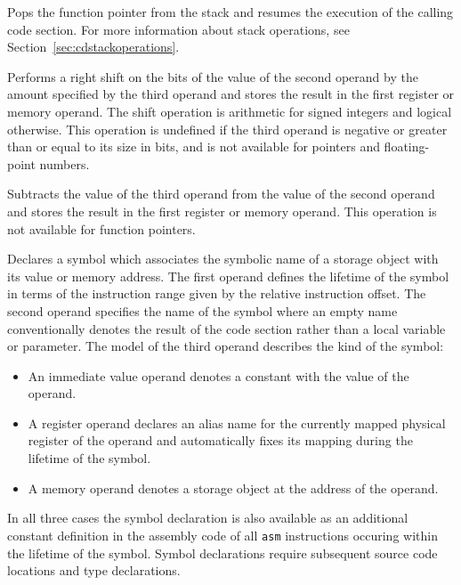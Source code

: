Pops the function pointer from the stack and resumes the execution of the calling code section.
For more information about stack operations, see Section~\ref{sec:cdstackoperations}.


Performs a right shift on the bits of the value of the second operand by the amount specified by the third operand and stores the result in the first register or memory operand.
The shift operation is arithmetic for signed integers and logical otherwise.
This operation is undefined if the third operand is negative or greater than or equal to its size in bits, and is not available for pointers and floating-point numbers.


Subtracts the value of the third operand from the value of the second operand and stores the result in the first register or memory operand.
This operation is not available for function pointers.


Declares a symbol which associates the symbolic name of a storage object with its value or memory address.
The first operand defines the lifetime of the symbol in terms of the instruction range given by the relative instruction offset.
The second operand specifies the name of the symbol where an empty name conventionally denotes the result of the code section rather than a local variable or parameter.
The model of the third operand describes the kind of the symbol:

\begin{itemize}
\item An immediate value operand denotes a constant with the value of the operand.
\item A register operand declares an alias name for the currently mapped physical register of the operand and automatically fixes its mapping during the lifetime of the symbol.
\item A memory operand denotes a storage object at the address of the operand.
\end{itemize}

In all three cases the symbol declaration is also available as an additional constant definition in the assembly code of all \texttt{asm} instructions occuring within the lifetime of the symbol.
Symbol declarations require subsequent source code locations and type declarations.

